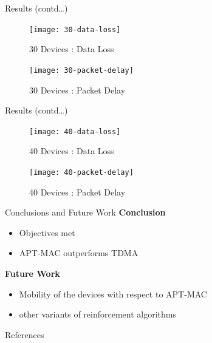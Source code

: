 \documentclass [xcolor=svgnames, t] {beamer}
\begin{document}
\begin{frame}{Results (contd\ldots)}
    \vspace{.5cm}
    \begin{figure}[ht]
        \begin{minipage}[b]{0.48\linewidth}
             \centering
                \texttt{[image: 30-data-loss]}
                \caption{30 Devices : Data Loss}
                \label{fig:30-device-dl}
        \end{minipage}
                     \hspace{.2cm} 
                     \begin{minipage}[b]{0.48\linewidth}
                         \centering
                         \texttt{[image: 30-packet-delay]}
                         \caption{30 Devices : Packet Delay}  
                         \label{fig:fig:30-device-PD}
        \end{minipage}
    \end{figure}
\end{frame}


\begin{frame}{Results (contd\ldots)}
       \vspace{.5cm}
         \begin{figure}[ht]      
             \begin{minipage}[b]{0.48\linewidth}
                \centering
                \texttt{[image: 40-data-loss]}
                 \caption{40 Devices : Data Loss}          
                 \label{fig:40-device-dl}                  
         \end{minipage}                                    
                      \hspace{.2cm} 
                      \begin{minipage}[b]{0.48\linewidth}
                          \centering
                          \texttt{[image: 40-packet-delay]}
                          \caption{40 Devices : Packet Delay}          
                          \label{fig:fig:40-device-PD}                     
                       \end{minipage}                                      
                   \end{figure}                                            
\end{frame}



\begin{frame}{Conclusions and Future Work}
    \textbf{Conclusion}
    \begin{itemize}
        \item Objectives met
        \item APT-MAC outperforms TDMA
    \end{itemize}
    \textbf{Future Work}
    \begin{itemize}
        \item Mobility of the devices with respect to APT-MAC
        \item other variants of reinforcement algorithms
    \end{itemize}
\end{frame}
\begin{frame}{References}
   \printbibliography
\end{frame}
\end{document}

